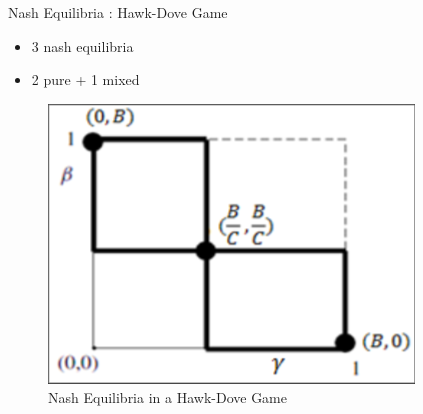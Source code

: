 \documentclass{IFES-beamer}
\begin{document}
        \begin{frame}{Nash Equilibria : Hawk-Dove Game}
        \begin{itemize}
                \item 3 nash equilibria
                \item 2 pure + 1 mixed
        \end{itemize}
            \begin{figure}
                \centering
                \includegraphics[scale=0.3]{Images/nash_eqm.png}
                \caption{Nash Equilibria in a Hawk-Dove Game\cite{Essam}}
                \label{fig:my_label}
            \end{figure}
        \end{frame}
        
\end{document}
